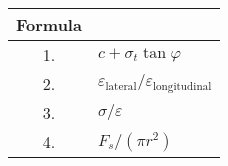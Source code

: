 \begin{tabular}[12pt]{ |c|l| }
\hline
\textbf{Formula} & \\ \hline
1. & $c+\sigma_t \tan \varphi$ \\ \hline
2. & $\varepsilon_{\text{lateral}}/\varepsilon_{\text{longitudinal}}$ \\ \hline
3. & $\sigma/\varepsilon$ \\ \hline
4. & $F_s/(\pi r^2)$ \\ \hline
\end{tabular}
